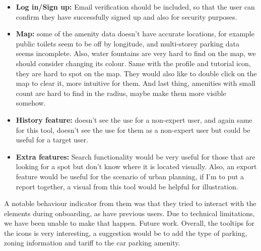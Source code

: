\begin{itemize}
    \item \textbf{Log in/Sign up: }Email verification should be included, so
    that the user can confirm they have successfully signed up and also for
    security purposes.
    \vspace{0.2cm}

    \item \textbf{Map: }some of the amenity data doesn't have accurate
    locations, for example public toilets seem to be off by longitude, and
    multi-storey parking data seems incomplete. Also, water fountains are very
    hard to find on the map, we should consider changing its colour. Same with
    the profile and tutorial icon, they are hard to spot on the map. They would
    also like to double click on the map to clear it, more intuitive for them.
    And last thing, amenities with small count are hard to find in the radius,
    maybe make them more visible somehow.
    \vspace{0.2cm}

    \item \textbf{History feature: }doesn't see the use for a non-expert user,
    and again same for this tool, doesn't see the use for them as a non-expert
    user but could be useful for a target user.
    \vspace{0.2cm}

    \item \textbf{Extra features: }Search functionality would be very useful for
    those that are looking for a spot but don't know where it is located
    visually. Also, an export feature would be useful for the scenario of urban
    planning, if I'm to put a report together, a visual from this tool would be
    helpful for illustration.
\end{itemize}

A notable behaviour indicator from them was that they tried to interact with the
elements during onboarding, as have previous users. Due to technical
limitations, we have been unable to make that happen. Future work.
Overall, the tooltips for the icons is very interesting, a suggestion would be
to add the type of parking, zoning information and tariff to the car parking
amenity.

